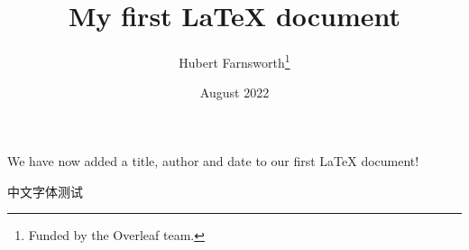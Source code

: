 \documentclass[12pt, letterpaper]{article}
\title{My first LaTeX document}
\author{Hubert Farnsworth\thanks{Funded by the Overleaf team.}}
\date{August 2022}
\begin{document}
\maketitle
We have now added a title, author and date to our first \LaTeX{} document!

中文字体测试
\end{document}
